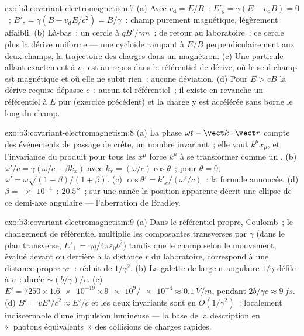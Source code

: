 \begin{solution}{exo:b3:covariant-electromagnetism:7}
(a) Avec $v_{\text{d}} = E/B$~: $E'_y = \gamma(E - v_{\text{d}}B) =
0$~; $B'_z = \gamma(B - v_{\text{d}}E/c^2) = B/\gamma$~: champ
purement magnétique, légèrement affaibli. (b) Là-bas~: un cercle à
$qB'/\gamma m$~; de retour au laboratoire~: ce cercle plus la dérive
uniforme --- une cycloïde rampant à $E/B$ perpendiculairement aux deux
champs, la trajectoire des charges dans un magnétron. (c) Une particule
allant exactement à $v_{\text{d}}$ est au repos dans le référentiel de
dérive, où le seul champ est magnétique et où elle ne subit rien~:
aucune déviation. (d) Pour $E > cB$ la dérive requise dépasse $c$~:
aucun tel référentiel~; il existe en revanche un référentiel à $E$ pur
(exercice précédent) et la charge y est accélérée sans borne le long du
champ.
\end{solution}

\begin{solution}{exo:b3:covariant-electromagnetism:8}
(a) La phase $\omega t - \vect k\cdot\vect r$ compte des événements de
passage de crête, un nombre invariant~; elle vaut $k^\mu x_\mu$, et
l'invariance du produit pour tous les $x^\mu$ force $k^\mu$ à se
transformer comme un . (b) $\omega'/c = \gamma(\omega/c -
\beta k_x)$ avec $k_x = (\omega/c)\cos\theta$~; pour $\theta = 0$,
$\omega' = \omega\sqrt{(1-\beta)/(1+\beta)}$. (c) $\cos\theta' =
k'_x/(\omega'/c)$~: la formule annoncée. (d) $\beta = \num{e-4}$~:
$20.5''$~; sur une année la position apparente décrit une ellipse de ce
demi-axe angulaire --- l'aberration de Bradley.
\end{solution}

\begin{solution}{exo:b3:covariant-electromagnetism:9}
(a) Dans le référentiel propre, Coulomb~; le changement de référentiel
multiplie les composantes transverses par $\gamma$ (dans le plan
transverse, $E'_\perp = \gamma
q/4\pi\varepsilon_0b^2$) tandis que le champ selon le mouvement,
évalué devant ou derrière à la distance $r$ du laboratoire, correspond
à une distance propre $\gamma r$~: réduit de $1/\gamma^2$. (b) La
galette de largeur angulaire $1/\gamma$ défile à $v$~: durée
$\sim (b/\gamma)/v$. (c)
$E' = 7250 \times \num{1.6e-19} \times \num{9e9}/\num{e-4} \approx
\qty{0.1}{V/m}$, pendant $2b/\gamma c \approx \qty{9}{fs}$. (d)
$B' = vE'/c^2 \approx E'/c$ et les deux invariants sont en
$O(1/\gamma^2)$~: localement indiscernable d'une impulsion lumineuse
--- la base de la description en «~photons équivalents~» des collisions
de charges rapides.
\end{solution}

